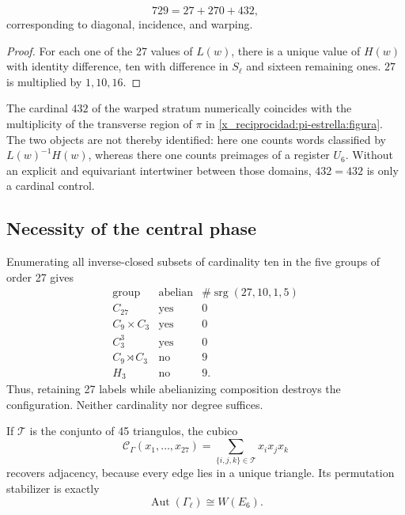 \begin{theorem}
\label{x_reciprocidad:p12-83-c20-s6:thm:particion-hensel-schlafli-nueva}
\begin{equation}
 729=27+270+432,
 \label{x_reciprocidad:p12-83-c20-s6:eq:particion-729-e6-nueva}
\end{equation}
corresponding to diagonal, incidence, and warping.
\end{theorem}

\begin{proof}
For each one of the 27 values of \(L(w)\), there is a unique value of
\(H(w)\) with identity difference, ten with difference in \(S_\ell\) and
sixteen remaining ones. \(27\) is multiplied by \(1,10,16\).
\end{proof}

The cardinal \(432\) of the warped stratum numerically coincides with the
multiplicity of the transverse region of \(\pi\) in
\cref{x_reciprocidad:pi-estrella:figura}. The two objects are not thereby identified: here
one counts words classified by \(L(w)^{-1}H(w)\), whereas there one
counts preimages of a register \(U_6\). Without an explicit and
equivariant intertwiner between those domains, \(432=432\) is only a cardinal control.

\subsection{Necessity of the central phase}

Enumerating all inverse-closed subsets of cardinality ten in the five groups of order 27 gives
\[
\begin{array}{c|c|c}
\text{group}&\text{abelian}&
\#\operatorname{srg}(27,10,1,5)\\ \hline
C_{27}&\text{yes}&0\\
C_9\times C_3&\text{yes}&0\\
C_3^3&\text{yes}&0\\
C_9\rtimes C_3&\text{no}&9\\
H_3&\text{no}&9.
\end{array}
\]
Thus, retaining 27 labels while abelianizing composition destroys the
configuration. Neither cardinality nor degree suffices.

If \(\mathcal T\) is the conjunto of 45 triangulos, the cubico
\[
 \mathcal C_\Gamma(x_1,\ldots,x_{27})
 =\sum_{\{i,j,k\}\in\mathcal T}x_ix_jx_k
\]
recovers adjacency, because every edge lies in a unique triangle. Its
permutation stabilizer is exactly
\[
 \operatorname{Aut}(\Gamma_\ell)\cong W(E_6).
\]


